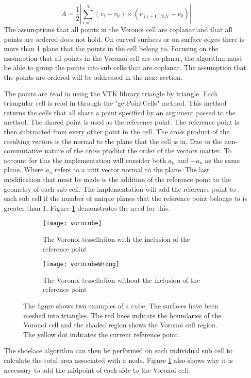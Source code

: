 \begin{equation}
    A = \frac{1}{2}|\sum_{i=1}^{N}(v_i - v_0) \times (v_{(i+1) \% N} - v_0) |
    \label{eq:Shoe}
\end{equation}
The assumptions that all points in the Voronoi cell are coplanar and that all points are ordered does not hold. On curved surfaces or on surface edges there is more than 1 plane that the points in the cell belong to. Focusing on the assumption that all points in the Voronoi cell are co-planar, the algorithm must be able to group the points into sub cells that are coplanar. The assumption that the points are ordered will be addressed in the next section. \par
The points are read in using the VTK library triangle by triangle. Each triangular cell is read in through the "getPointCells" method. This method returns the cells that all share a point specified by an argument passed to the method. The shared point is used as the reference point. The reference point is then subtracted from every other point in the cell. The cross product of the resulting vectors is the normal to the plane that the cell is in. Due to the non-commutative nature of the cross product the order of the vectors matter. To account for this the implementation will consider both $a_n$ and $-a_n$ as the same plane. Where $a_n$ refers to a unit vector normal to the plane. The last modification that must be made is the addition of the reference point to the geometry of each sub cell. The implementation will add the reference point to each sub cell if the number of unique planes that the reference point belongs to is greater than 1. Figure \ref{fig:voroComp} demonstrates the need for this.

\begin{figure}[h]
    \centering
    \begin{subfigure}[b]{0.45\textwidth}
        \centering
        \texttt{[image: vorocube]}
        \caption{The Voronoi tessellation with the inclusion of the reference point}
    \end{subfigure}
    \hfill
    \begin{subfigure}[b]{0.45\textwidth}
        \centering
        \texttt{[image: vorocubeWrong]}
        \caption{The Voronoi tessellation without the inclusion of the reference point}
    \end{subfigure}
    \caption{The figure shows two examples of a cube. The surfaces have been meshed into triangles. The red lines indicate the boundaries of the Voronoi cell and the shaded region shows the Voronoi cell region. The yellow dot indicates the current reference point.}
    \label{fig:voroComp}
\end{figure}
The shoelace algorithm can then be performed on each individual sub cell to calculate the total area associated with a node. Figure \ref{fig:voroComp} also shows why it is necessary to add the midpoint of each side to the Voronoi cell.
